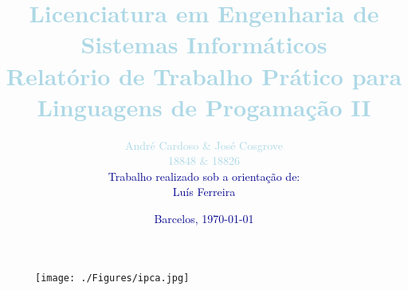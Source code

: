 \documentclass[a4paper, 12pt]{report}
\begin{document}
	
	
	\makeatletter
	\setlength{\@fptop}{0pt}
	\makeatother
		
	\begin{figure}[t!]
		\centering
		\texttt{[image: ./Figures/ipca.jpg]}
		\label{fig:ipca}
	\end{figure}

	\title{
		\textbf{\Large{\textcolor{lightBlue}{Licenciatura em Engenharia de Sistemas Informáticos}}}\\
		\bigskip
		\Large{\textcolor{lightBlue}{Relatório de Trabalho Prático para}}\\
		\bigskip
		\textbf{\Huge{\textcolor{lightBlue}{Linguagens de Progamação II}}}
	}
	
	
	\author{
		\bigskip
		\huge{\textcolor{lightBlue}{André Cardoso \& José Cosgrove}}\\
		\huge{\textcolor{lightBlue}{18848 \& 18826}}\\
		\textcolor{darkBlue}{Trabalho realizado sob a orientação de:}\\
		\textcolor{darkBlue}{Luís Ferreira}\\
	}
	\date{\textcolor{darkBlue}{Barcelos, \today}}
	
	\maketitle
	
	\bigskip
	
	\tableofcontents
	
	
	
%	
%	
%	
%	
%	
	
	
	
	
	
		
\end{document}

